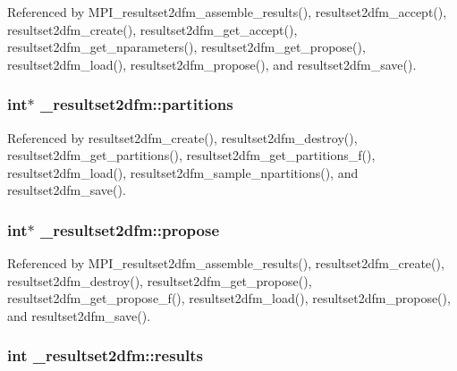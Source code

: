 Referenced by M\+P\+I\+\_\+resultset2dfm\+\_\+assemble\+\_\+results(), resultset2dfm\+\_\+accept(), resultset2dfm\+\_\+create(), resultset2dfm\+\_\+get\+\_\+accept(), resultset2dfm\+\_\+get\+\_\+nparameters(), resultset2dfm\+\_\+get\+\_\+propose(), resultset2dfm\+\_\+load(), resultset2dfm\+\_\+propose(), and resultset2dfm\+\_\+save().

\subsubsection[{\texorpdfstring{partitions}{partitions}}]{\setlength{\rightskip}{0pt plus 5cm}int$\ast$ \+\_\+resultset2dfm\+::partitions}\hypertarget{struct__resultset2dfm_a4eb90b0c43ec8bd0086ac39bcd11df29}{}\label{struct__resultset2dfm_a4eb90b0c43ec8bd0086ac39bcd11df29}


Referenced by resultset2dfm\+\_\+create(), resultset2dfm\+\_\+destroy(), resultset2dfm\+\_\+get\+\_\+partitions(), resultset2dfm\+\_\+get\+\_\+partitions\+\_\+f(), resultset2dfm\+\_\+load(), resultset2dfm\+\_\+sample\+\_\+npartitions(), and resultset2dfm\+\_\+save().

\subsubsection[{\texorpdfstring{propose}{propose}}]{\setlength{\rightskip}{0pt plus 5cm}int$\ast$ \+\_\+resultset2dfm\+::propose}\hypertarget{struct__resultset2dfm_a52e3d26f1dac68365ca7b14da19b1cae}{}\label{struct__resultset2dfm_a52e3d26f1dac68365ca7b14da19b1cae}


Referenced by M\+P\+I\+\_\+resultset2dfm\+\_\+assemble\+\_\+results(), resultset2dfm\+\_\+create(), resultset2dfm\+\_\+destroy(), resultset2dfm\+\_\+get\+\_\+propose(), resultset2dfm\+\_\+get\+\_\+propose\+\_\+f(), resultset2dfm\+\_\+load(), resultset2dfm\+\_\+propose(), and resultset2dfm\+\_\+save().

\subsubsection[{\texorpdfstring{results}{results}}]{\setlength{\rightskip}{0pt plus 5cm}int \+\_\+resultset2dfm\+::results}\hypertarget{struct__resultset2dfm_af5de4920c584494e6366a07cb342f657}{}\label{struct__resultset2dfm_af5de4920c584494e6366a07cb342f657}


